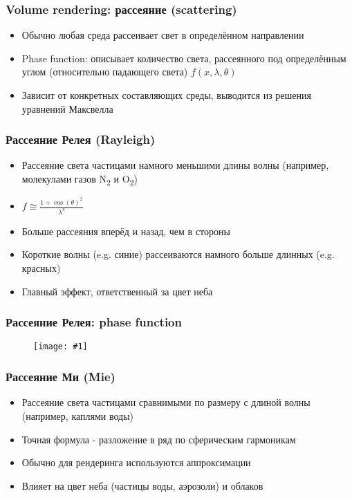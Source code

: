 \documentclass{beamer}
\newcommand{\slideimage}[1]{
  \begin{figure}
    \begin{adjustbox}{width=\textwidth, totalheight=\textheight-2\baselineskip-2\baselineskip,keepaspectratio}
      \texttt{[image: \#1]}
    \end{adjustbox}
  \end{figure}
}
\begin{document}
\begin{frame}[fragile]
\frametitle{Volume rendering: рассеяние (scattering)}
\begin{itemize}
\item Обычно любая среда рассеивает свет в определённом направлении
\pause
\item Phase function: описывает количество света, рассеянного под определённым углом (относительно падающего света) \begin{math}f(x, \lambda, \theta)\end{math}
\pause
\item Зависит от конкретных составляющих среды, выводится из решения уравнений Максвелла
\end{itemize}
\end{frame}

\begin{frame}[fragile]
\frametitle{Рассеяние Релея (Rayleigh)}
\begin{itemize}
\item Рассеяние света частицами намного меньшими длины волны (например, молекулами газов N\textsubscript{2} и O\textsubscript{2})
\pause
\item \begin{math}f \cong \frac{1+\cos(\theta)^2}{\lambda^4}\end{math}
\pause
\item Больше рассеяния вперёд и назад, чем в стороны
\pause
\item Короткие волны (e.g. синие) рассеиваются намного больше длинных (e.g. красных)
\pause
\item Главный эффект, ответственный за цвет неба
\end{itemize}
\end{frame}

\begin{frame}[fragile]
\frametitle{Рассеяние Релея: phase function}
\slideimage{rayleigh-phase.png}
\end{frame}

\begin{frame}[fragile]
\frametitle{Рассеяние Ми (Mie)}
\begin{itemize}
\item Рассеяние света частицами сравнимыми по размеру с длиной волны (например, каплями воды)
\pause
\item Точная формула - разложение в ряд по сферическим гармоникам
\pause
\item Обычно для рендеринга используются аппроксимации
\pause
\item Влияет на цвет неба (частицы воды, аэрозоли) и облаков
\end{itemize}
\end{frame}
\end{document}
